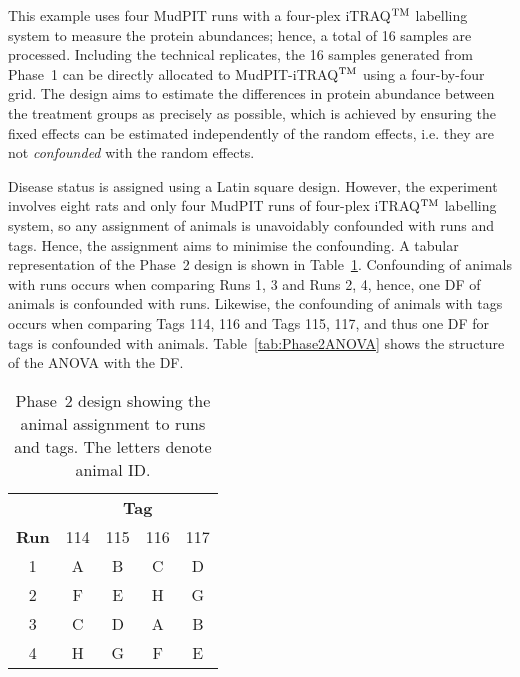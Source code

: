 \documentclass[article]{jss}
\begin{document}
This example uses four MudPIT runs with a four-plex iTRAQ$^{\rm TM}$ labelling system to measure the protein abundances; hence, a total of 16 samples are processed. Including the technical replicates, the 16 samples generated from Phase~1 can be directly allocated to MudPIT-iTRAQ$^{\rm TM}$ using a four-by-four grid. The design aims to estimate the differences in protein abundance between the treatment groups as precisely as possible, which is achieved by ensuring the fixed effects can be estimated independently of the random effects, i.e. they are not \emph{confounded} with the random effects.

Disease status is assigned using a Latin square design. However, the experiment involves eight rats and only four MudPIT runs of four-plex iTRAQ$^{\rm TM}$ labelling system, so any assignment of animals is unavoidably confounded with runs and tags. Hence, the assignment aims to minimise the confounding. A tabular representation of the Phase~2 design is shown in Table~\ref{tab:phase2Design}. Confounding of animals with runs occurs when comparing Runs 1, 3 and Runs 2, 4, hence, one DF of animals is confounded with runs. Likewise, the confounding of animals with tags occurs when comparing Tags 114, 116 and Tags 115, 117, and thus one DF for tags is confounded with animals. Table~\ref{tab:Phase2ANOVA} shows the structure of the ANOVA with the DF.

\begin{table}[ht]
\centering
\caption{Phase~2 design showing the animal assignment to runs and tags. The letters denote animal ID.}
\begin{tabular}[t]{c|cccc}
 & \multicolumn{4}{c}{{\bf Tag}} \\
{\bf Run}  & 114 & 115 & 116 & 117 \\ 
\hline 
1 & A & B & C & D \\ 
2 & F & E & H & G \\ 
3 & C & D & A & B \\ 
4 & H & G & F & E \\ 
\end{tabular} 
\label{tab:phase2Design}
\end{table}
\end{document}
